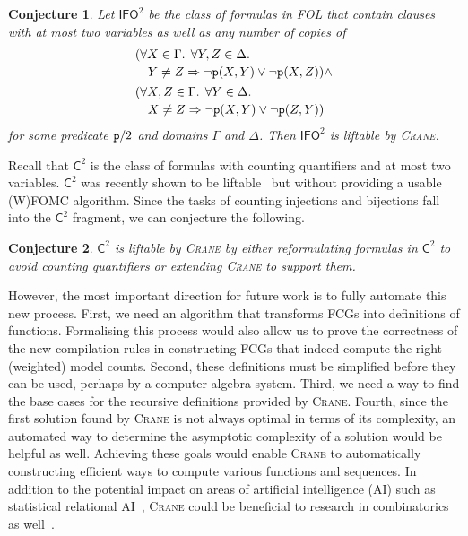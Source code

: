 \documentclass{article}
\newtheorem{conjecture}{Conjecture}
\theoremstyle{definition}
\newcommand{\Ctwo}{$\mathsf{C}^{2}$}
\newcommand{\IFO}{$\mathsf{I}\mathsf{FO}^{2}$}
\begin{document}
\begin{conjecture}
  Let \IFO{} be the class of formulas in FOL that contain clauses with at most
  two variables as well as any number of copies of
  \begin{align*}
    &\begin{multlined}[t]
      (\forall X \in \Gamma\text{. }\forall Y, Z \in \Delta\text{. }\\
      Y \ne Z \Rightarrow \neg \texttt{\textup{p}}(X, Y) \lor \neg \texttt{\textup{p}}(X, Z)) \land
    \end{multlined}\\
    &\begin{multlined}[t]
      (\forall X, Z \in \Gamma\text{. }\forall Y \in \Delta\text{. }\\
      X \ne Z \Rightarrow \neg \texttt{\textup{p}}(X, Y) \lor \neg \texttt{\textup{p}}(Z, Y))
    \end{multlined}
  \end{align*}
  for some predicate $\texttt{\textup{p}}/2$ and domains $\Gamma$ and $\Delta$.
  Then \IFO{} is liftable by \textsc{Crane}.
\end{conjecture}

Recall that \Ctwo{} is the class of formulas with counting quantifiers and at
most two variables. \Ctwo{} was recently shown to be
liftable~\cite{DBLP:journals/jair/Kuzelka21} but without providing a usable
(W)FOMC algorithm. Since the tasks of counting injections and bijections fall
into the \Ctwo{} fragment, we can conjecture the following.

\begin{conjecture}
  \Ctwo{} is liftable by \textsc{Crane} by either reformulating formulas in
  \Ctwo{} to avoid counting quantifiers or extending \textsc{Crane} to support
  them.
\end{conjecture}

However, the most important direction for future work is to fully automate this
new process. First, we need an algorithm that transforms FCGs into definitions
of functions. Formalising this process would also allow us to prove the
correctness of the new compilation rules in constructing FCGs that indeed
compute the right (weighted) model counts. Second, these definitions must be
simplified before they can be used, perhaps by a computer algebra system. Third,
we need a way to find the base cases for the recursive definitions provided by
\textsc{Crane}. Fourth, since the first solution found by \textsc{Crane} is not
always optimal in terms of its complexity, an automated way to determine the
asymptotic complexity of a solution would be helpful as well. Achieving these
goals would enable \textsc{Crane} to automatically constructing efficient ways
to compute various functions and sequences. In addition to the potential impact
on areas of artificial intelligence (AI) such as statistical relational
AI~\cite{DBLP:series/synthesis/2016Raedt}, \textsc{Crane} could be beneficial to
research in combinatorics as well~\cite{DBLP:conf/ilp/BarvinekB0ZK21}.



\end{document}
